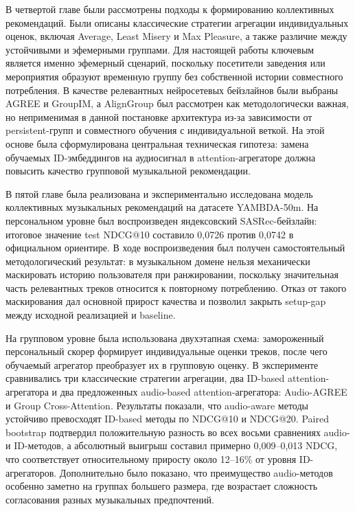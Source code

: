 В четвертой главе были рассмотрены подходы к формированию коллективных рекомендаций. Были описаны классические стратегии агрегации индивидуальных оценок, включая Average, Least Misery и Max Pleasure, а также различие между устойчивыми и эфемерными группами. Для настоящей работы ключевым является именно эфемерный сценарий, поскольку посетители заведения или мероприятия образуют временную группу без собственной истории совместного потребления. В качестве релевантных нейросетевых бейзлайнов были выбраны AGREE и GroupIM, а AlignGroup был рассмотрен как методологически важная, но неприменимая в данной постановке архитектура из-за зависимости от persistent-групп и совместного обучения с индивидуальной веткой. На этой основе была сформулирована центральная техническая гипотеза: замена обучаемых ID-эмбеддингов на аудиосигнал в attention-агрегаторе должна повысить качество групповой музыкальной рекомендации.

В пятой главе была реализована и экспериментально исследована модель коллективных музыкальных рекомендаций на датасете YAMBDA-50m. На персональном уровне был воспроизведен яндексовский SASRec-бейзлайн: итоговое значение test NDCG@10 составило 0{,}0726 против 0{,}0742 в официальном ориентире. В ходе воспроизведения был получен самостоятельный методологический результат: в музыкальном домене нельзя механически маскировать историю пользователя при ранжировании, поскольку значительная часть релевантных треков относится к повторному потреблению. Отказ от такого маскирования дал основной прирост качества и позволил закрыть setup-gap между исходной реализацией и baseline.

На групповом уровне была использована двухэтапная схема: замороженный персональный скорер формирует индивидуальные оценки треков, после чего обучаемый агрегатор преобразует их в групповую оценку. В эксперименте сравнивались три классические стратегии агрегации, два ID-based attention-агрегатора и два предложенных audio-based attention-агрегатора: Audio-AGREE и Group Cross-Attention. Результаты показали, что audio-aware методы устойчиво превосходят ID-based методы по NDCG@10 и NDCG@20. Paired bootstrap подтвердил положительную разность во всех восьми сравнениях audio- и ID-методов, а абсолютный выигрыш составил примерно 0{,}009--0{,}013 NDCG, что соответствует относительному приросту около 12--16\% от уровня ID-агрегаторов. Дополнительно было показано, что преимущество audio-методов особенно заметно на группах большего размера, где возрастает сложность согласования разных музыкальных предпочтений.

